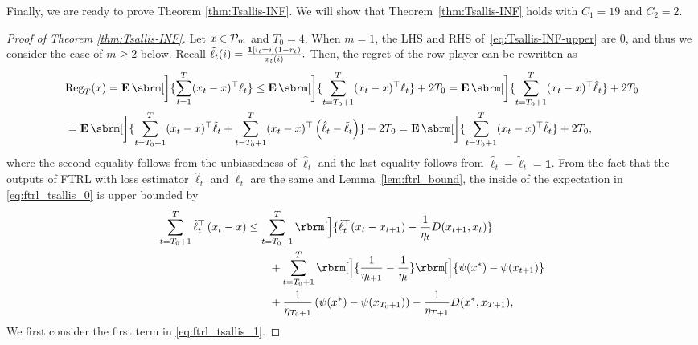 Finally, we are ready to prove Theorem \ref{thm:Tsallis-INF}.
We will show that Theorem~\ref{thm:Tsallis-INF} holds with $C_1 = 19$ and $C_2 = 2$.
\begin{proof}[Proof of Theorem \ref{thm:Tsallis-INF}]
Let $x \in \mathcal{P}_m$ and $T_0 = 4$.
When $m = 1$, the LHS and RHS of~\eqref{eq:Tsallis-INF-upper} are $0$, and thus we consider the case of $m \geq 2$ below.
Recall 
$
\tilde{\ell}_t(i)
=
\frac{\operatorname{\boldsymbol{1}}[i_t=i](1 - r_t)}{x_t(i)}.
$
Then, the regret of the row player can be rewritten as
\begin{align}
    &
    \Rr_T(x)
    =
    \E\sbrm[\bigg]{
        \sum_{t=1}^T (x_t - x)^\top \ell_t
    }
    \leq
    \E\sbrm[\bigg]{
        \sum_{t=T_0+1}^T (x_t - x)^\top \ell_t
    }
    +
    2 T_0
    =
    \E\sbrm[\bigg]{
        \sum_{t=T_0+1}^T (x_t - x)^\top \hat{\ell}_t
    }
    +
    2 T_0
    \nonumber \\
    &=
    \E\sbrm[\bigg]{
        \sum_{t=T_0+1}^T (x_t - x)^\top \tilde{\ell}_t
        +
        \sum_{t=T_0+1}^T (x_t - x)^\top \left( \hat{\ell}_t - \tilde{\ell}_t \right)
    }
    +
    2 T_0
    =
    \E\sbrm[\bigg]{
        \sum_{t=T_0+1}^T (x_t - x)^\top \tilde{\ell}_t
    }
    +
    2 T_0
    ,
    \label{eq:ftrl_tsallis_0}
\end{align}
where the second equality follows from the unbiasedness of $\hat{\ell}_t$
and the last equality follows from $\hat{\ell}_t - \tilde{\ell}_t = \mathbf{1}$.
From the fact that the outputs of FTRL with loss estimator $\hat{\ell}_t$ and $\tilde{\ell}_t$ are the same and Lemma~\ref{lem:ftrl_bound}, the inside of the expectation in \eqref{eq:ftrl_tsallis_0} is upper bounded by
\begin{align}
    \sum_{t=T_0+1}^T \tilde{\ell}_t^\top \left( x_t - x \right)
    &\leq
    \sum_{t=T_0+1}^T
    \rbrm[\Big]{
        \tilde{\ell}_t^\top (x_t - x_{t+1})
        -
        \frac{1}{\eta_t} D(x_{t+1}, x_t)
        }
    \nonumber \\
    &\qquad+
    \sum_{t=T_0+1}^T
    \rbrm[\Big]{
        \frac{1}{\eta_{t+1}}
        -
        \frac{1}{\eta_{t}}
    }
    \rbrm[\Big]{
        \psi(x^*)
        -
        \psi( x_{t+1} )
    }
    \nonumber \\
    &\qquad+
    \frac{1}{\eta_{T_0+1}} \left(
        \psi(x^*)
        -
        \psi(x_{T_0+1})
    \right)
    -
    \frac{1}{\eta_{T+1}}
    D(x^*, x_{T+1}),
    \label{eq:ftrl_tsallis_1}
\end{align}
We first consider the first term in \eqref{eq:ftrl_tsallis_1}.


\end{proof}
